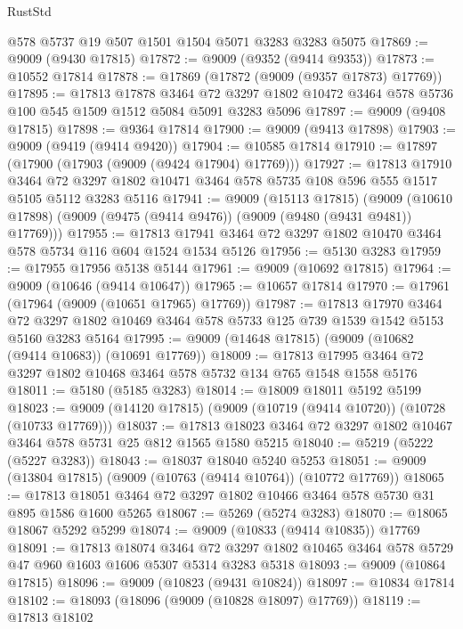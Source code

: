 \begin{lexlean}{RustStd}
\begin{coremodule}
    @578
    @5737
    @19
    @507
    @1501
    @1504
    @5071
    @3283
    @3283
    @5075
@17869 := @9009 (@9430 @17815)
@17872 := @9009 (@9352 (@9414 @9353))
@17873 := @10552 @17814
@17878 := @17869 (@17872 (@9009 (@9357 @17873) @17769))
@17895 := @17813
    @17878
    @3464
    @72
    @3297
    @1802
    @10472
    @3464
    @578
    @5736
    @100
    @545
    @1509
    @1512
    @5084
    @5091
    @3283
    @5096
@17897 := @9009 (@9408 @17815)
@17898 := @9364 @17814
@17900 := @9009 (@9413 @17898)
@17903 := @9009 (@9419 (@9414 @9420))
@17904 := @10585 @17814
@17910 := @17897 (@17900 (@17903 (@9009 (@9424 @17904) @17769)))
@17927 := @17813
    @17910
    @3464
    @72
    @3297
    @1802
    @10471
    @3464
    @578
    @5735
    @108
    @596
    @555
    @1517
    @5105
    @5112
    @3283
    @5116
@17941 := @9009
    (@15113 @17815)
    (@9009 (@10610 @17898) (@9009 (@9475 (@9414 @9476)) (@9009 (@9480 (@9431 @9481)) @17769)))
@17955 := @17813 @17941 @3464 @72 @3297 @1802 @10470 @3464 @578 @5734 @116 @604 @1524 @1534 @5126
@17956 := @5130 @3283
@17959 := @17955 @17956 @5138 @5144
@17961 := @9009 (@10692 @17815)
@17964 := @9009 (@10646 (@9414 @10647))
@17965 := @10657 @17814
@17970 := @17961 (@17964 (@9009 (@10651 @17965) @17769))
@17987 := @17813
    @17970
    @3464
    @72
    @3297
    @1802
    @10469
    @3464
    @578
    @5733
    @125
    @739
    @1539
    @1542
    @5153
    @5160
    @3283
    @5164
@17995 := @9009 (@14648 @17815) (@9009 (@10682 (@9414 @10683)) (@10691 @17769))
@18009 := @17813 @17995 @3464 @72 @3297 @1802 @10468 @3464 @578 @5732 @134 @765 @1548 @1558 @5176
@18011 := @5180 (@5185 @3283)
@18014 := @18009 @18011 @5192 @5199
@18023 := @9009 (@14120 @17815) (@9009 (@10719 (@9414 @10720)) (@10728 (@10733 @17769)))
@18037 := @17813 @18023 @3464 @72 @3297 @1802 @10467 @3464 @578 @5731 @25 @812 @1565 @1580 @5215
@18040 := @5219 (@5222 (@5227 @3283))
@18043 := @18037 @18040 @5240 @5253
@18051 := @9009 (@13804 @17815) (@9009 (@10763 (@9414 @10764)) (@10772 @17769))
@18065 := @17813 @18051 @3464 @72 @3297 @1802 @10466 @3464 @578 @5730 @31 @895 @1586 @1600 @5265
@18067 := @5269 (@5274 @3283)
@18070 := @18065 @18067 @5292 @5299
@18074 := @9009 (@10833 (@9414 @10835)) @17769
@18091 := @17813
    @18074
    @3464
    @72
    @3297
    @1802
    @10465
    @3464
    @578
    @5729
    @47
    @960
    @1603
    @1606
    @5307
    @5314
    @3283
    @5318
@18093 := @9009 (@10864 @17815)
@18096 := @9009 (@10823 (@9431 @10824))
@18097 := @10834 @17814
@18102 := @18093 (@18096 (@9009 (@10828 @18097) @17769))
@18119 := @17813
    @18102

\end{coremodule}
\end{lexlean}
